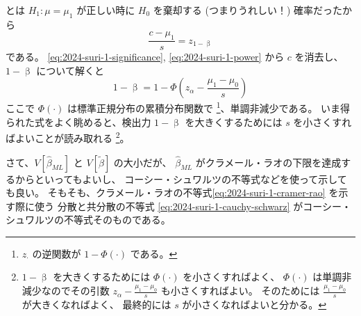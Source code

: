 \documentclass[./main.tex]{subfiles}
\begin{document}
\begin{enumerate}
         とは $H_1: \mu = \mu_1$ が正しい時に $H_0$ を棄却する (つまりうれしい！) 確率だったから
        \begin{equation}\label{eq:2024-suri-1-power}
            \frac{c - \mu_1}{s} = z_{1 - \upbeta}
        \end{equation}
        である。
        \eqref{eq:2024-suri-1-significance}, \eqref{eq:2024-suri-1-power} から $c$ を消去し、$1 - \upbeta$ について解くと
        \begin{equation}
            1 - \upbeta
                = 1 - \Phi \left( z_\alpha - \frac{\mu_1 - \mu_0}{s}  \right)
        \end{equation}
        ここで $\Phi (\cdot)$ は標準正規分布の累積分布関数で
        \footnote{$z_{\cdot}$ の逆関数が $1 - \Phi(\cdot)$ である。}、単調非減少である。
        いま得られた式をよく眺めると、検出力 $1 - \upbeta$ を大きくするためには $s$ を小さくすればよいことが読み取れる
        \footnote{
            $1 - \upbeta$ を大きくするためには $\Phi (\cdot)$ を小さくすればよく、
            $\Phi (\cdot)$ は単調非減少なのでその引数 $z_\alpha - \frac{\mu_1 - \mu_0}{s}$ も小さくすればよい。
            そのためには $\frac{\mu_1 - \mu_0}{s}$ が大きくなればよく、
            最終的には $s$ が小さくなればよいと分かる。
        }。

        さて、$V [\hat{\beta}_{ML}]$ と $V [\tilde{\beta}]$ の大小だが、
        $\hat{\beta}_{ML}$ がクラメール・ラオの下限を達成するからといってもよいし、
        コーシー・シュワルツの不等式などを使って示しても良い。
        そもそも、クラメール・ラオの不等式\eqref{eq:2024-suri-1-cramer-rao} を示す際に使う
        分散と共分散の不等式 \eqref{eq:2024-suri-1-cauchy-schwarz} がコーシー・シュワルツの不等式そのものである。




\end{enumerate}
\end{document}
